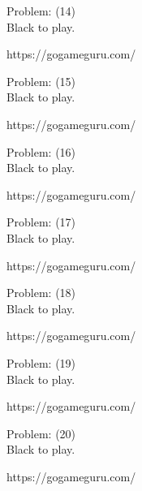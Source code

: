 \documentclass[11pt]{article}
\begin{document}
\begin{minipage}[t]{0.5\textwidth}
  {\centering
  
Problem: (14)\\
Black to play.

https://gogameguru.com/\\
  }
\end{minipage}
\begin{minipage}[t]{0.5\textwidth}
  {\centering
  
Problem: (15)\\
Black to play.

https://gogameguru.com/\\
  }
\end{minipage}
\begin{minipage}[t]{0.5\textwidth}
  {\centering
  
Problem: (16)\\
Black to play.

https://gogameguru.com/\\
  }
\end{minipage}
\begin{minipage}[t]{0.5\textwidth}
  {\centering
  
Problem: (17)\\
Black to play.

https://gogameguru.com/\\
  }
\end{minipage}
\begin{minipage}[t]{0.5\textwidth}
  {\centering
  
Problem: (18)\\
Black to play.

https://gogameguru.com/\\
  }
\end{minipage}
\begin{minipage}[t]{0.5\textwidth}
  {\centering
  
Problem: (19)\\
Black to play.

https://gogameguru.com/\\
  }
\end{minipage}
\begin{minipage}[t]{0.5\textwidth}
  {\centering
  
Problem: (20)\\
Black to play.

https://gogameguru.com/\\
  }
\end{minipage}
\end{document}
